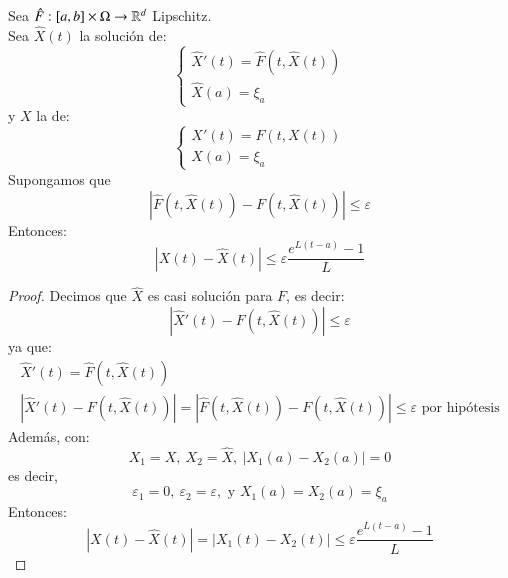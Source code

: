 \begin{pro}
    Sea $\hat{F} : [a, b] \times \Omega \to \mathbb{R}^d$ Lipschitz.\\
    Sea $\hat{X}(t)$ la solución de:
    $$
        \begin{cases}
            \hat{X}'(t) = \hat{F}(t, \hat{X}(t))\\
            \hat{X}(a)=\xi_a
        \end{cases}
    $$
    y $X$ la de:
    $$
    \begin{cases}
        X'(t) = F(t, X(t))\\
        X(a)=\xi_a
    \end{cases}
    $$
    Supongamos que
    $$
        |\hat{F} (t, \hat{X}(t)) - F(t, \hat{X}(t))| \leq \varepsilon
    $$
    Entonces:
    $$
        |X(t) - \hat{X}(t)| \leq \varepsilon \frac{e^{L(t-a)}-1}{L}
    $$
\end{pro}
\begin{proof}
    Decimos que $\hat{X}$ es casi solución para $F$, es decir:
    $$
        |\hat{X}'(t) - F(t, \hat{X}(t))| \leq \varepsilon
    $$
    ya que:
    \begin{gather*}
        \hat{X}'(t) = \hat{F}(t, \hat{X}(t))\\
        |\hat{X}'(t) - F(t, \hat{X}(t))| = |\hat{F} (t, \hat{X}(t)) - F(t, \hat{X}(t))| \leq \varepsilon \text{ por hipótesis}
    \end{gather*}
    Además, con:
    $$
        X_1 = X,\ X_2 = \hat{X},\ |X_1(a) - X_2(a)| = 0
    $$
    es decir,
    $$
        \varepsilon_1 = 0,\  \varepsilon_2 = \varepsilon, \text{ y } X_1(a) = X_2(a) = \xi_a
    $$
    Entonces:
    $$
        |X(t) - \hat{X}(t)| = |X_1(t) - X_2(t)| \leq \varepsilon \frac{e^{L(t-a)}-1}{L}
    $$
\end{proof}
